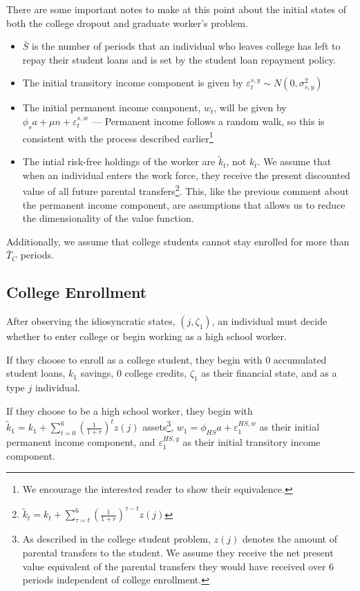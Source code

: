   There are some important notes to make at this point about the initial states of both the college
  dropout and graduate worker's problem.

  \begin{itemize}
    \item $\bar{S}$ is the number of periods that an individual who leaves college has left to repay
      their student loans and is set by the student loan repayment policy.
    \item The initial transitory income component is given by
      $\varepsilon^{s, y}_{t} \sim N(0, \sigma^2_{s, y})$
    \item The initial permanent income component, $w_t$, will be given by
      $\phi_s a + \mu n + \varepsilon^{s, w}_{t}$ --- Permanent income follows a random walk, so
      this is consistent with the process described earlier\footnote{We encourage the interested
      reader to show their equivalence.}
    \item The intial risk-free holdings of the worker are $\tilde{k}_t$, not $k_t$. We assume that
      when an individual enters the work force, they receive the present discounted value of all
      future parental transfers\footnote{
      $\tilde{k}_t = k_t + \sum_{\tau=t}^6 \left(\frac{1}{1+r} \right)^{\tau - t} z(j)$}. This, like
      the previous comment about the permanent income component, are assumptions that allows us to
      reduce the dimensionality of the value function.
  \end{itemize}

  Additionally, we assume that college students cannot stay enrolled for more than $\bar{T}_C$
  periods.


%
%
\subsection{College Enrollment}

  After observing the idiosyncratic states, $(j, \zeta_1)$, an individual must decide whether to
  enter college or begin working as a high school worker.

  If they choose to enroll as a college student, they begin with 0 accumulated student loans, $k_1$
  savings, 0 college credits, $\zeta_1$ as their financial state, and as a type $j$ individual.

  If they choose to be a high school worker, they begin with $\tilde{k}_1 = k_1 + \sum_{t=0}^6
  \left(\frac{1}{1+r}\right)^t z(j)$ assets\footnote{As described in the college student problem,
  $z(j)$ denotes the amount of parental transfers to the student. We assume they receive the net
  present value equivalent of the parental transfers they would have received over 6 periods
  independent of college enrollment.}, $w_1 = \phi_{HS} a + \varepsilon^{HS, w}_1$ as their
  initial permanent income component, and $\varepsilon^{HS, y}_1$ as their initial transitory income
  component.


